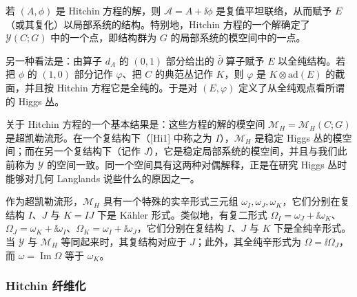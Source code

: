 若 $(A,\phi)$ 是 Hitchin 方程的解，则 $\mathcal{A}=A+\ii\phi$ 是复值平坦联络，从而赋予 $E$（或其复化）以局部系统的结构。特别地，Hitchin 方程的一个解确定了 $\mathcal{Y}(C;G)$ 中的一个点，即结构群为 $G$ 的局部系统的模空间中的一点。

另一种看法是：由算子 $d_A$ 的 $(0,1)$ 部分给出的 $\bar\partial$ 算子赋予 $E$ 以全纯结构。若把 $\phi$ 的 $(1,0)$ 部分记作 $\varphi$、把 $C$ 的典范丛记作 $K$，则 $\varphi$ 是 $K\otimes\mathrm{ad}(E)$ 的截面，并且按 Hitchin 方程它是全纯的。于是对 $(E,\varphi)$ 定义了从全纯观点看所谓的 Higgs 丛。

关于 Hitchin 方程的一个基本结果是：这些方程的解的模空间 $\mathcal{M}_H=\mathcal{M}_H(C;G)$ 是超凯勒流形。在一个复结构下（[Hi1] 中称之为 $I$），$\mathcal{M}_H$ 是稳定 Higgs 丛的模空间；而在另一个复结构下（记作 $J$），它是稳定局部系统的模空间，并且与我们此前称为 $\mathcal{Y}$ 的空间一致。同一个空间具有这两种对偶解释，正是在研究 Higgs 丛时能够对几何 Langlands 说些什么的原因之一。

作为超凯勒流形，$\mathcal{M}_H$ 具有一个特殊的实辛形式三元组 $\omega_I,\omega_J,\omega_K$，它们分别在复结构 $I$、$J$ 与 $K=IJ$ 下是 Kähler 形式。类似地，有复二形式 $\Omega_I=\omega_J+\ii\omega_K$、$\Omega_J=\omega_K+\ii\omega_I$、$\Omega_K=\omega_I+\ii\omega_J$，它们分别在复结构 $I$、$J$ 与 $K$ 下是全纯辛形式。当 $\mathcal{Y}$ 与 $\mathcal{M}_H$ 等同起来时，其复结构对应于 $J$；此外，其全纯辛形式为 $\Omega=\ii\Omega_J$，而 $\omega=\operatorname{Im}\Omega$ 等于 $\omega_K$。

\subsubsection{Hitchin 纤维化}

